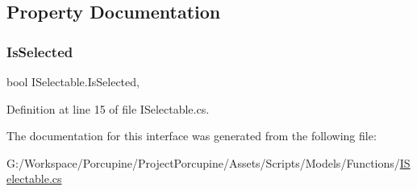 \subsection{Property Documentation}
\mbox{\label{interface_i_selectable_a52eadd6ad90b4dcb9073f4488b0b137f}} 
\subsubsection{\texorpdfstring{Is\+Selected}{IsSelected}}
{\footnotesize\ttfamily bool I\+Selectable.\+Is\+Selected\hspace{0.3cm}{\ttfamily [get]}, {\ttfamily [set]}}



Definition at line 15 of file I\+Selectable.\+cs.



The documentation for this interface was generated from the following file\+:\begin{DoxyCompactItemize}
\item 
G\+:/\+Workspace/\+Porcupine/\+Project\+Porcupine/\+Assets/\+Scripts/\+Models/\+Functions/\hyperlink{_i_selectable_8cs}{I\+Selectable.\+cs}\end{DoxyCompactItemize}
